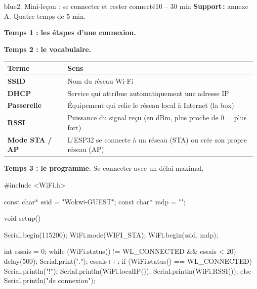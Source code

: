 \documentclass[11pt,a4paper]{article}
\begin{document}
\begin{etape}{blue}{2. Mini-leçon : se connecter et rester connecté}{10 -- 30 min}
\textbf{Support\,:} annexe A. Quatre temps de 5 min.

\textbf{Temps 1 : les étapes d'une connexion.}
\begin{center}
\end{center}

\textbf{Temps 2 : le vocabulaire.}
\begin{center}
\begin{tabularx}{\linewidth}{>{\bfseries}p{3cm}Y}
\toprule
Terme & Sens\\
\midrule
SSID & Nom du réseau Wi-Fi\\
DHCP & Service qui attribue automatiquement une adresse IP\\
Passerelle & Équipement qui relie le réseau local à Internet (la box)\\
RSSI & Puissance du signal reçu (en dBm, plus proche de 0 = plus fort)\\
Mode STA / AP & L'ESP32 se connecte à un réseau (STA) ou crée son propre réseau (AP)\\
\bottomrule
\end{tabularx}
\end{center}

\textbf{Temps 3 : le programme.} Se connecter avec un délai maximal.
\begin{arduino}
#include <WiFi.h>

const char* ssid = "Wokwi-GUEST";
const char* mdp  = "";

void setup() {
  Serial.begin(115200);
  WiFi.mode(WIFI_STA);
  WiFi.begin(ssid, mdp);

  int essais = 0;
  while (WiFi.status() != WL_CONNECTED && essais < 20) {
    delay(500);
    Serial.print(".");
    essais++;
  }
  if (WiFi.status() == WL_CONNECTED) {
    Serial.println("\nConnecte !");
    Serial.println(WiFi.localIP());
    Serial.println(WiFi.RSSI());
  } else {
    Serial.println("\nEchec de connexion");
  }
}


\end{arduino}
\end{etape}
\end{document}
